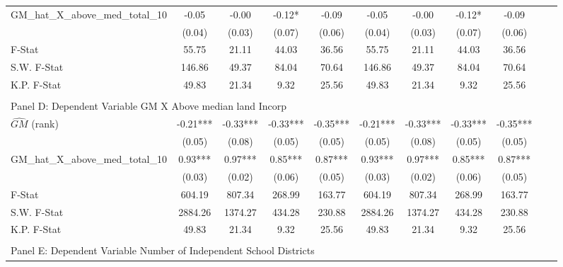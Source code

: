 \begin{table}[htbp]
\begin{threeparttable}
\begin{tabular}{l*{10}{c}}
\addlinespace
GM\_hat\_X\_above\_med\_total\_10&      -0.05   &      -0.00   &      -0.12*  &      -0.09   &      -0.05   &      -0.00   &      -0.12*  &      -0.09   \\
                &     (0.04)   &     (0.03)   &     (0.07)   &     (0.06)   &     (0.04)   &     (0.03)   &     (0.07)   &     (0.06)   \\
\midrule
F-Stat          &      55.75   &      21.11   &      44.03   &      36.56   &      55.75   &      21.11   &      44.03   &      36.56   \\
S.W. F-Stat     &     146.86   &      49.37   &      84.04   &      70.64   &     146.86   &      49.37   &      84.04   &      70.64   \\
K.P. F-Stat     &      49.83   &      21.34   &       9.32   &      25.56   &      49.83   &      21.34   &       9.32   &      25.56   \\
\cmidrule[\heavyrulewidth](lr){1-9} \\ \cmidrule[\heavyrulewidth](lr){1-9}
\multicolumn{8}{l}{Panel D: Dependent Variable GM X Above median land Incorp}\\
\cmidrule(lr){1-9}
$\hat{GM}$ (rank)&      -0.21***&      -0.33***&      -0.33***&      -0.35***&      -0.21***&      -0.33***&      -0.33***&      -0.35***\\
                &     (0.05)   &     (0.08)   &     (0.05)   &     (0.05)   &     (0.05)   &     (0.08)   &     (0.05)   &     (0.05)   \\
\addlinespace
GM\_hat\_X\_above\_med\_total\_10&       0.93***&       0.97***&       0.85***&       0.87***&       0.93***&       0.97***&       0.85***&       0.87***\\
                &     (0.03)   &     (0.02)   &     (0.06)   &     (0.05)   &     (0.03)   &     (0.02)   &     (0.06)   &     (0.05)   \\
\midrule
F-Stat          &     604.19   &     807.34   &     268.99   &     163.77   &     604.19   &     807.34   &     268.99   &     163.77   \\
S.W. F-Stat     &    2884.26   &    1374.27   &     434.28   &     230.88   &    2884.26   &    1374.27   &     434.28   &     230.88   \\
K.P. F-Stat     &      49.83   &      21.34   &       9.32   &      25.56   &      49.83   &      21.34   &       9.32   &      25.56   \\
\cmidrule[\heavyrulewidth](lr){1-9} \\ \cmidrule[\heavyrulewidth](lr){1-9}
\multicolumn{8}{l}{Panel E: Dependent Variable Number of Independent School Districts}\\

\end{tabular}
\end{threeparttable}
\end{table}
